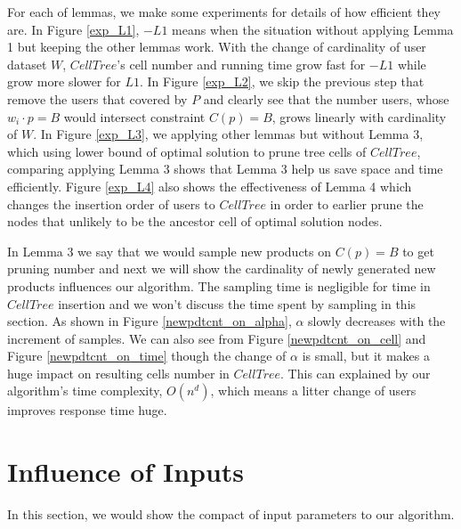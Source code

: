 For each of lemmas, we make some experiments for details of how efficient they are.
In Figure \ref{exp_L1}, $-L1$ means when the situation without applying Lemma 1 but 
keeping the other lemmas work. With the change of cardinality of user dataset $W$,
$CellTree$'s cell number and running time grow fast for $-L1$ while grow more slower
for $L1$. In Figure \ref{exp_L2}, we skip the previous step that remove the users 
that covered by $P$ and clearly see that the number users, whose $w_i\cdot p=B$ 
would intersect constraint $C(p)=B$, grows linearly with cardinality of $W$. 
In Figure \ref{exp_L3}, we applying other lemmas but without Lemma 3, which 
using lower bound of optimal solution to prune tree cells of $CellTree$, comparing
applying Lemma 3 shows that Lemma 3 help us save space and time efficiently. Figure
\ref{exp_L4} also shows the effectiveness of Lemma 4 which changes the insertion order of
users to $CellTree$ in order to earlier prune the nodes that unlikely to be the
ancestor cell of optimal solution nodes.


In Lemma 3 we say that we would sample new products on $C(p)=B$ to get pruning number and 
next we will show the cardinality of newly generated new products influences our algorithm.
 The sampling time is negligible
for time in $CellTree$ insertion and we won't discuss the time spent by sampling in this section.
As shown in Figure \ref{newpdtcnt_on_alpha}, $\alpha$ slowly decreases with the increment of samples. 
We can also see from Figure \ref{newpdtcnt_on_cell} and Figure \ref{newpdtcnt_on_time} though
the change of $\alpha$ is small, but it makes a huge impact on resulting cells number in 
$CellTree$. This can explained by our algorithm's time complexity, $O(n^d)$, which means a 
litter change of users improves response time huge. 



\section{Influence of Inputs}
In this section, we would show the compact of input parameters to our algorithm. 

